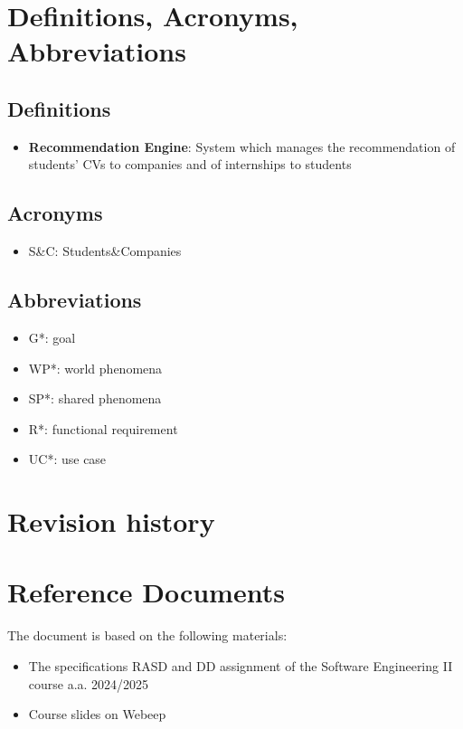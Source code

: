 \section{Definitions, Acronyms, Abbreviations }
\subsection{Definitions }

\begin{itemize}
    \item \textbf{Recommendation Engine}: System which manages the recommendation of students' CVs to companies and of internships to students
\end{itemize}

\subsection{Acronyms }
\begin{itemize}
    \item S\&C: Students\&Companies
\end{itemize}

\subsection{Abbreviations }
\begin{itemize}
    \item G*: goal
    \item WP*: world phenomena
    \item SP*: shared phenomena
    \item R*: functional requirement
    \item UC*: use case
\end{itemize}

\section{Revision history }


\section{Reference Documents }
The document is based on the following materials:
\begin{itemize}
    \item The specifications RASD and DD assignment of the Software Engineering II course a.a. 2024/2025
    \item Course slides on Webeep
\end{itemize}

